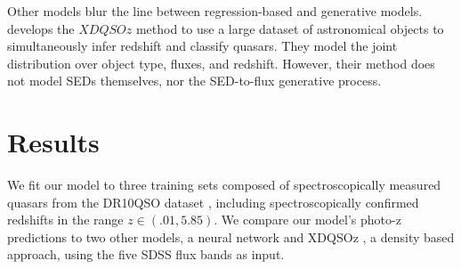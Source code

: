 \documentclass{article} %
\begin{document}
Other models blur the line between regression-based and generative models. \cite{bovy2012photometric} develops the $XDQSOz$ method to use a large dataset of astronomical objects to simultaneously infer redshift and classify quasars.  
They model the joint distribution over object type, fluxes, and redshift.  However, their method does not model SEDs themselves, nor the SED-to-flux generative process. 





\section{Results}
\label{sec:experiments}
We fit our model to three training sets composed of spectroscopically measured quasars from the DR10QSO dataset \cite{paris2014sloan}, including spectroscopically confirmed redshifts in the range ${z \in (.01,  5.85)}$.  
We compare our model's photo-z predictions to two other models, a neural network \cite{brescia2013photometric} and XDQSOz \cite{bovy2012photometric}, a density based approach, using the five SDSS flux bands as input.  
\end{document}

